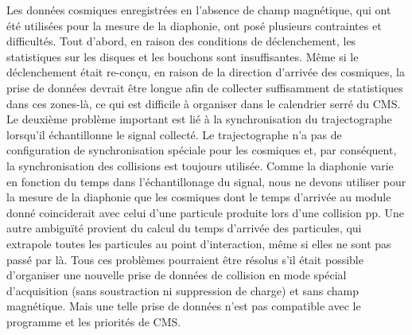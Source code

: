 
Les données cosmiques enregistrées en l'absence de champ magnétique, qui ont été utilisées pour la mesure de la diaphonie, ont posé plusieurs contraintes et difficultés. Tout d'abord, en raison des conditions de déclenchement, les statistiques sur les disques et les bouchons sont insuffisantes. Même si le déclenchement était re-conçu, en raison de la direction d'arrivée des cosmiques, la prise de données devrait être longue afin de collecter suffisamment de statistiques dans ces zones-là, ce qui est difficile à organiser dans le calendrier serré du CMS. Le deuxième problème important est lié à la synchronisation du trajectographe lorsqu'il échantillonne le signal collecté. Le trajectographe n'a pas de configuration de synchronisation spéciale pour les cosmiques et, par conséquent, la synchronisation des collisions est toujours utilisée. Comme la diaphonie varie en fonction du temps dans l'échantillonage du signal, nous ne devons utiliser pour la mesure de la diaphonie que les cosmiques dont le temps d'arrivée au module donné coinciderait avec celui d'une particule produite lors d'une collision pp. Une autre ambiguïté provient du calcul du temps d'arrivée des particules, qui extrapole toutes les particules au point d'interaction, même si elles ne sont pas passé par là. Tous ces problèmes pourraient être résolus s'il était possible d'organiser une nouvelle prise de données de collision en mode spécial d'acquisition (sans soustraction ni suppression de charge) et sans champ magnétique. Mais une telle prise de données n'est pas compatible avec le programme et les priorités de CMS.

